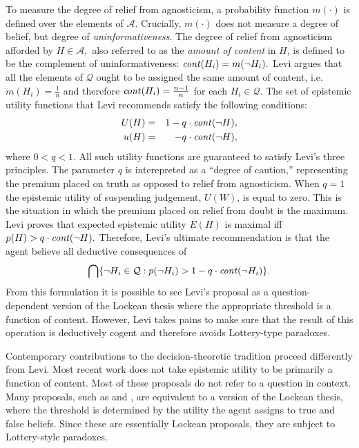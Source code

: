 To measure the degree of relief from agnosticism, a probability function
$m(\cdot)$ is defined over the elements of $\mathcal{A}$. Crucially, $m(\cdot)$
does not measure a degree of belief, but degree of {\em uninformativeness}.  The
degree of relief from agnosticism afforded by $H\in \mathcal{A},$ also referred
to as the {\em amount of content} in $H$,  is defined to be the complement of
uninformativeness: $\text{\textit{cont}}(H_i) = m(\neg H_i).$  Levi argues that
all the elements of $\mathcal{Q}$ ought to be assigned the same amount of
content, i.e. $m(H_i)=\frac{1}{n}$ and therefore $\text{\textit{cont}}(H_i)=
\frac{n-1}{n}$  for each $H_i\in\mathcal{Q}$. The set of epistemic utility
functions that Levi recommends satisfy the following conditions:
$$
 \begin{aligned}
    U(H) &=& 1 - q\cdot \text{\textit{cont}}(\neg H),\\
    u(H) &=& \hspace{7pt} - q\cdot \text{\textit{cont}}(\neg H),
  \end{aligned}
$$
where $0<q<1.$ All such utility functions are guaranteed to satisfy Levi's three
principles. The parameter $q$ is interepreted as a ``degree of caution,''
representing the premium  placed on truth as opposed to relief from agnosticism.
When $q=1$ the epistemic utility of suspending judgement, $U(W)$, is equal to
zero. This is the situation in which the premium placed on relief from doubt is
the maximum. Levi proves that expected epistemic utility $E(H)$ is maximal iff
$p(H)> q \cdot \text{\textit{cont}}(\neg H).$ Therefore, Levi's ultimate
recommendation is that the agent believe all deductive consequences of $$\bigcap
\{ \neg H_i \in \mathcal{Q} : p(\neg H_i)> 1 - q \cdot \text{\textit{cont}}(\neg
H_i) \}.$$ From this formulation  it is possible to see Levi's proposal as a
question-dependent version of the Lockean thesis where the appropriate threshold
is a function of content. However, Levi takes pains to make sure that the result
of this operation is deductively cogent and therefore  avoids Lottery-type
paradoxes.

Contemporary contributions to the decision-theoretic tradition proceed
differently from Levi. Most recent work does not take epistemic utility to be
primarily a function of content. Most of these proposals do not refer to a
question in context.  Many proposals, such as \citet{easwaran2015truthlove} and
\citet{dorst2017lockeans}, are equivalent to a version of the Lockean thesis,
where the threshold is determined by the utility the agent assigns to true and
false beliefs. Since these are essentially Lockean proposals, they are subject
to Lottery-style paradoxes.





%  

% 
